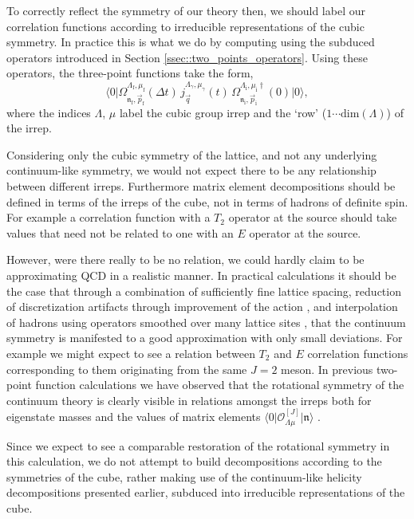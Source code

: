 \documentclass[twocolumn,amsmath,amssymb,prd,10pt,floatfix, 
superscriptaddress,nofootinbib, showpacs, preprintnumbers]{revtex4-1}
\begin{document}
To correctly reflect the symmetry of our theory then, we should label our correlation functions according to irreducible representations of the cubic symmetry. In practice this is what we do by computing using the subduced operators introduced in Section \ref{ssec::two_points_operators}. Using these operators, the three-point functions take the form,
\begin{equation}
	\big\langle 0 \big| \Omega_{\mathfrak{n}_\mathrm{f}, \vec{p}_\mathrm{f}}^{\Lambda_\mathrm{f},\mu_\mathrm{f}}(\Delta t) \, j_{\vec{q}}^{\Lambda_\gamma, \mu_\gamma}(t) \, \Omega_{\mathfrak{n}_\mathrm{i}, \vec{p}_\mathrm{i}}^{\Lambda_\mathrm{i},\mu_\mathrm{i}\dag}(0) \big| 0 \big\rangle, \label{subduced_3pt}
\end{equation}
where the indices $\Lambda$, $\mu$ label the cubic group irrep and the `row' ($1\cdots\text{dim}(\Lambda)$) of the irrep. 

Considering only the cubic symmetry of the lattice, and not any underlying continuum-like symmetry, we would not expect there to be any relationship between different irreps. Furthermore matrix element decompositions should be defined in terms of the irreps of the cube, not in terms of hadrons of definite spin. For example a correlation function with a $T_2$ operator at the source should take values that need not be related to one with an $E$ operator at the source.

However, were there really to be no relation, we could hardly claim to be approximating QCD in a realistic manner. In practical calculations it should be the case that through a combination of sufficiently fine lattice spacing, reduction of discretization artifacts through improvement of the action \cite{Symanzik:1983dc}, and interpolation of hadrons using operators smoothed over many lattice sites \cite{Davoudi:2012ya}, that the continuum symmetry is manifested to a good approximation with only small deviations. For example we might expect to see a relation between $T_2$ and $E$ correlation functions corresponding to them originating from the same $J=2$ meson. In previous two-point function calculations we have observed that the rotational symmetry of the continuum theory is clearly visible in relations amongst the irreps both for eigenstate masses and the values of matrix elements $\big\langle 0 \big| \mathcal{O}_{\Lambda \mu}^{[J]} \big| \mathfrak{n} \big\rangle$ \cite{Dudek:2009qf, Dudek:2010wm}.  

Since we expect to see a comparable restoration of the rotational symmetry in this calculation, we do not attempt to build decompositions according to the symmetries of the cube, rather making use of the continuum-like helicity decompositions presented earlier, subduced  into irreducible representations of the cube. 
\end{document}
